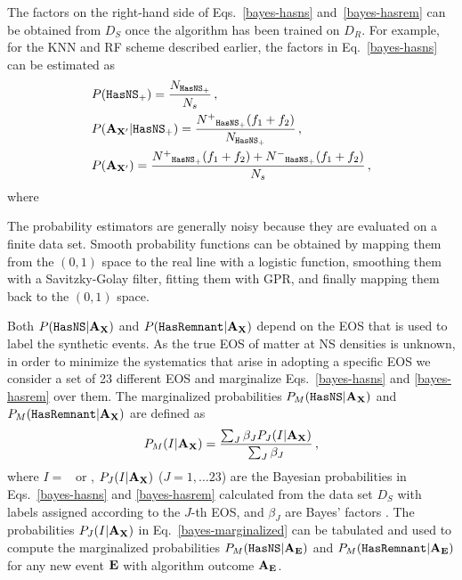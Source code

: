 The factors on the right-hand side of Eqs.~\eqref{bayes-hasns} and~\eqref{bayes-hasrem} can be obtained from $D_{S}$ once the algorithm has been trained on $D_{R}$. For example, for the \ac{KNN} and \ac{RF} scheme described earlier, the factors in Eq.~\eqref{bayes-hasns} can be estimated as  
%
\begin{align}
&P({{\tt HasNS}}_+)=\frac{N_{{{\tt HasNS}}_+}}{N_s}\,,\nonumber\\
&P({\bf A}_{{\bf X}'}|{{\tt HasNS}}_+)=\frac{N^+{}_{{{\tt HasNS}}_+}(f_1+f_2)}{N_{{{\tt HasNS}}_+}}\,,\\
&P({\bf A}_{{\bf X}'})=\frac{N^+{}_{{{\tt HasNS}}_+}(f_1+f_2)+N^-{}_{{{\tt HasNS}}_+}(f_1+f_2)}{N_s}\,,\nonumber
\label{bayes-est}
\end{align}
%
where 

The probability estimators are generally noisy because they are evaluated on a finite data set. Smooth probability functions can be obtained by mapping them from the $(0,1)$ space to the
real line with a logistic function, smoothing them with a Savitzky-Golay filter, fitting them with \ac{GPR}, and finally mapping them back to the $(0,1)$ space.   

Both $P({{\tt HasNS}}|{\bf A}_{\bf X})$ and $P({{\tt HasRemnant}}|{\bf A}_{\bf X})$ depend on the \ac{EOS} that is used to label the synthetic events. As the true \ac{EOS} of matter at \ac{NS} densities is
unknown, in order to minimize the systematics that arise in adopting a specific \ac{EOS} we consider a set of 23 different \ac{EOS} and marginalize Eqs.~\eqref{bayes-hasns} and
\eqref{bayes-hasrem} over them. The marginalized probabilities $P_M({{\tt HasNS}}|{\bf A}_{\bf X})$ and $P_M({{\tt HasRemnant}}|{\bf A}_{\bf X})$ are defined as
%
\begin{equation}
\begin{aligned}
P_M(I|{\bf A}_{\bf X})=\frac{\sum_J\beta_J P_J(I|{\bf A}_{\bf X})}{\sum_J\beta_J}\,,
\label{bayes-marginalized}
\end{aligned}
\end{equation}
%
where $I=$ \hasns\ or \hasrem, $P_J(I|{\bf A}_{\bf X})$ ($J=1,\dots 23$) are the Bayesian probabilities in Eqs.~\eqref{bayes-hasns} and \eqref{bayes-hasrem} calculated from the data set
$D_S$ with labels assigned according to the $J$-th \ac{EOS}, and $\beta_J$ are Bayes' factors . The probabilities $P_J(I|{\bf A}_{\bf X})$ in
Eq.~\eqref{bayes-marginalized} can be tabulated and used to compute the marginalized probabilities $P_M({{\tt HasNS}}|{\bf A}_{\bf E})$ and $P_M({{\tt HasRemnant}}|{\bf A}_{\bf E})$ for any new event $\bf
E$ with algorithm outcome $\bf A_{E}$. 
